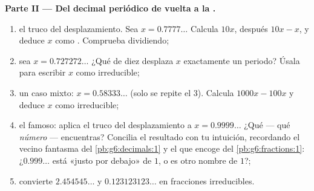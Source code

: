 \begin{problem}
\medskip
\noindent\textbf{Parte II --- Del decimal periódico de vuelta a la
.}
\begin{enumerate}[resume]
  \item el truco del desplazamiento. Sea $x = 0.7777\ldots$ Calcula $10x$,
        después $10x - x$, y deduce $x$ como . Comprueba
        dividiendo;
  \item sea $x = 0.727272\ldots$ ¿Qué  de diez desplaza $x$
        exactamente un periodo? Úsala para escribir $x$ como
         irreducible;
  \item un caso mixto: $x = 0.58333\ldots$ (solo se repite el
        $3$). Calcula $1000x - 100x$ y deduce $x$ como
         irreducible;
  \item el famoso: aplica el truco del desplazamiento a
        $x = 0.9999\ldots$ ¿Qué  --- qué \emph{número}
        --- encuentras? Concilia el resultado con tu
        intuición, recordando el vecino fantasma del
        \cref{pb:g6:decimals:1} y el  que encoge del
        \cref{pb:g6:fractions:1}: ¿$0.999\ldots$ está «justo por debajo» de
        $1$, o es otro nombre de $1$?;
  \item convierte $2.454545\ldots$ y $0.123123123\ldots$ en
        fracciones irreducibles.
\end{enumerate}


\end{problem}
